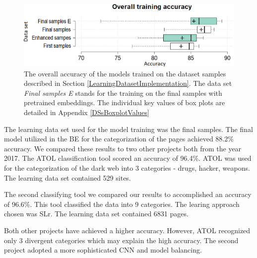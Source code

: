  \begin{figure}[t]
    \includegraphics[width =\textwidth]{Images/DSsBoxplot.png}
    \caption{The overall accuracy of the models trained on the dataset samples described in Section \ref{LearningDatasetImplementation}. The data set \textit{Final samples E} stands for the training on the final samples with pretrained embeddings. The individual key values of box plots are detailed in Appendix \ref{DSsBoxplotValues} }
    \label{DSsBoxplot}
\end{figure}

\FloatBarrier
The learning data set used for the model training was the final samples. The final model utilized in the BE for the categorization of the pages achieved 88.2\% accuracy. We compared these results to two other projects both from the year 2017. The ATOL \cite{atol} classification tool scored an accuracy of 96.4\%. ATOL was used for the categorization of the dark web into 3 categories - drugs, hacker, weapons. The learning data set contained 529 sites. 

The second classifying tool \cite{classificationProject} we compared our results to accomplished an accuracy of 96.6\%. This tool classified the data into 9 categories. The learing approach chosen was SLr. The learning data set contained 6831 pages. 

Both other projects have achieved a higher accuracy. However, ATOL recognized only 3 divergent categories which may explain the high accuracy. The second project adopted a more sophisticated CNN and model balancing. 

